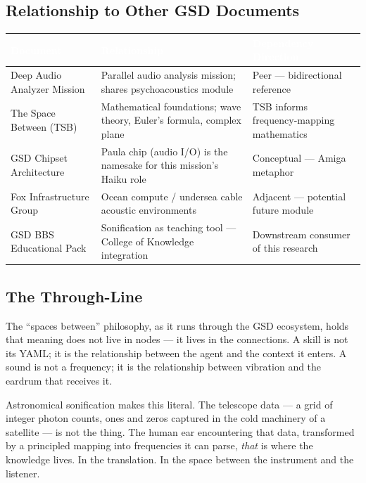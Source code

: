\documentclass[11pt,letterpaper]{article}
\newcommand{\tableheader}[1]{\textbf{\sffamily\textcolor{white}{#1}}}
\begin{document}
\subsection{Relationship to Other GSD Documents}

\begin{center}
\begin{tabularx}{\textwidth}{L{4cm}L{5cm}L{4.5cm}}
\toprule
{}
\tableheader{Document} & \tableheader{Relationship} & \tableheader{Dependency Direction} \\
\midrule
Deep Audio Analyzer Mission & Parallel audio analysis mission; shares psychoacoustics module & Peer — bidirectional reference \\
The Space Between (TSB) & Mathematical foundations; wave theory, Euler's formula, complex plane & TSB informs frequency-mapping mathematics \\
GSD Chipset Architecture & Paula chip (audio I/O) is the namesake for this mission's Haiku role & Conceptual — Amiga metaphor \\
Fox Infrastructure Group & Ocean compute / undersea cable acoustic environments & Adjacent — potential future module \\
GSD BBS Educational Pack & Sonification as teaching tool — College of Knowledge integration & Downstream consumer of this research \\
\bottomrule
\end{tabularx}
\end{center}

\subsection{The Through-Line}

The ``spaces between'' philosophy, as it runs through the GSD ecosystem, holds that meaning does not live in nodes — it lives in the connections. A skill is not its YAML; it is the relationship between the agent and the context it enters. A sound is not a frequency; it is the relationship between vibration and the eardrum that receives it.

Astronomical sonification makes this literal. The telescope data — a grid of integer photon counts, ones and zeros captured in the cold machinery of a satellite — is not the thing. The human ear encountering that data, transformed by a principled mapping into frequencies it can parse, \emph{that} is where the knowledge lives. In the translation. In the space between the instrument and the listener.
\end{document}
